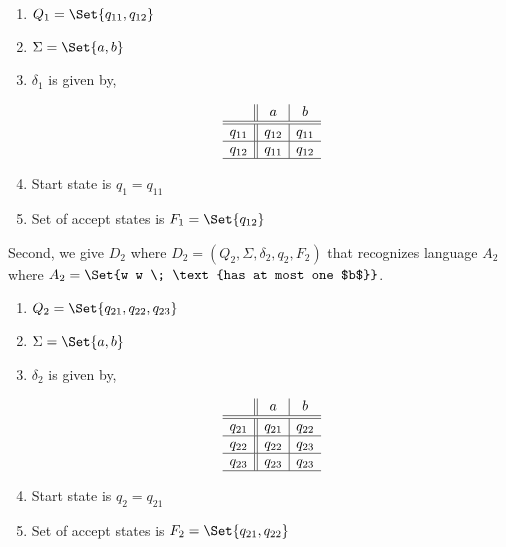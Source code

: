 \documentclass{article}
\providecommand\given{} %
\begin{document}
\begin{enumerate}
    \item $Q_1 = \Set{q_{11}, q_{12}}$
    \item $\Sigma = \Set{a,b}$
    \item $\delta_1$ is given by,
    
\begin{figure}[H]
\centering

\[
\begin{array}{c||c|c}
         & a & b \\ \hline \hline 
        q_{11} & q_{12} & q_{11} \\ \hline 
        q_{12} & q_{11} & q_{12} \\ \hline 
\end{array}
\]

\caption{}
\label{fig:1bd1}
\end{figure}


    
    \item Start state is $q_1 = q_{11}$
    \item Set of accept states is $F_1 = \Set{q_{12}}$
\end{enumerate}

Second, we give $D_2$ where $D_2 = (Q_2, \Sigma, \delta_2, q_2, F_2)$ that recognizes language $A_2$ where $A_2 = \Set{w \given w \; \text{has at most one $b$}}$.  

\begin{enumerate}
    \item $Q_2 = \Set{q_{21}, q_{22}, q_{23}}$
    \item $\Sigma = \Set{a,b}$
    \item $\delta_2$ is given by, 
    
\begin{figure}[H]
\centering

\[
\begin{array}{c||c|c}
         & a & b \\ \hline \hline 
        q_{21} & q_{21} & q_{22} \\ \hline 
        q_{22} & q_{22} & q_{23} \\ \hline 
        q_{23} & q_{23} & q_{23} \\ \hline 
\end{array}
\]

\caption{}
\label{fig:1bd2}
\end{figure}

    
    \item Start state is $q_2 = q_{21}$
    \item Set of accept states is $F_2 = \Set{q_{21}, q_{22}}$
\end{enumerate}
\end{document}
